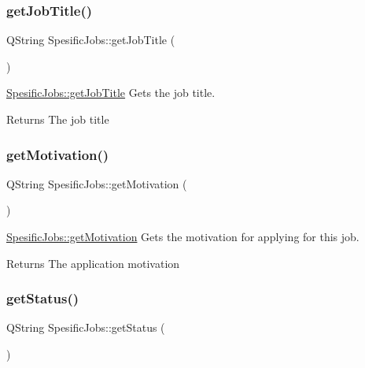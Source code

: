 \subsubsection{\texorpdfstring{get\+Job\+Title()}{getJobTitle()}}
{\footnotesize\ttfamily Q\+String Spesific\+Jobs\+::get\+Job\+Title (\begin{DoxyParamCaption}{ }\end{DoxyParamCaption})}



\mbox{\hyperlink{class_spesific_jobs_afe77ad902d3e9f3cfd5f057e0a37a193}{Spesific\+Jobs\+::get\+Job\+Title}} Gets the job title. 

\begin{DoxyReturn}{Returns}
The job title 
\end{DoxyReturn}
\mbox{\label{class_spesific_jobs_a73406f6204c990c3fa3c7b9d16f1b0b9}} 
\subsubsection{\texorpdfstring{get\+Motivation()}{getMotivation()}}
{\footnotesize\ttfamily Q\+String Spesific\+Jobs\+::get\+Motivation (\begin{DoxyParamCaption}{ }\end{DoxyParamCaption})}



\mbox{\hyperlink{class_spesific_jobs_a73406f6204c990c3fa3c7b9d16f1b0b9}{Spesific\+Jobs\+::get\+Motivation}} Gets the motivation for applying for this job. 

\begin{DoxyReturn}{Returns}
The application motivation 
\end{DoxyReturn}
\mbox{\label{class_spesific_jobs_aefe905d920961199fec0aff37a34b50d}} 
\subsubsection{\texorpdfstring{get\+Status()}{getStatus()}}
{\footnotesize\ttfamily Q\+String Spesific\+Jobs\+::get\+Status (\begin{DoxyParamCaption}{ }\end{DoxyParamCaption})}



